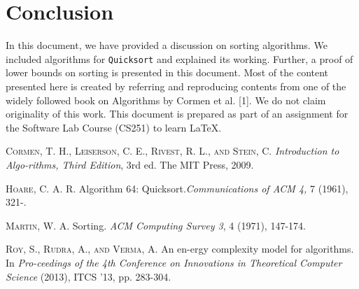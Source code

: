 \documentclass[a4paper, 10pt,twocolumn]{article}
\begin{document}
\section{Conclusion}
In this document, we have provided a discussion on sorting algorithms. We included algorithms for \texttt{Quicksort} and explained its working. Further, a proof of lower bounds on sorting is presented in this document.  Most of the content presented here is created by referring and reproducing contents from one of the widely followed book on Algorithms by Cormen et al. [1]. We do not claim originality of this work. This document is prepared as part of an assignment for the Software Lab Course (CS251) to learn \LaTeX.


\begin{thebibliography}{}
\textsc{Cormen, T. H., Leiserson, C. E., Rivest, R. L., and  Stein,  C}. \textit{Introduction to Algo-rithms, Third Edition}, 3rd ed. The MIT Press, 2009.

\textsc{Hoare, C. A. R}. Algorithm 64: Quicksort.\textit{Communications of ACM 4,} 7 (1961), 321-.

\textsc{Martin, W. A.} Sorting. \textit{ACM Computing Survey 3}, 4 (1971), 147-174.

\textsc{Roy, S., Rudra, A., and Verma}, A. An en-ergy complexity model for algorithms. In \textit{Pro-ceedings of the 4th Conference on Innovations in Theoretical Computer Science }(2013), ITCS '13, pp. 283-304.

\end{thebibliography}
\end{document}
